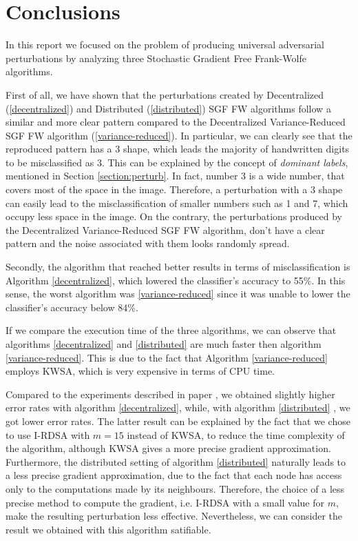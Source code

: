 \section{Conclusions}
In this report we focused on the problem of producing universal adversarial perturbations by analyzing three
Stochastic Gradient Free Frank-Wolfe algorithms.

First of all, we have shown that the perturbations created by Decentralized (\ref{decentralized}) and Distributed (\ref{distributed})
SGF FW algorithms follow a similar and more clear pattern compared to the Decentralized Variance-Reduced SGF FW
algorithm (\ref{variance-reduced}). In particular, we can clearly see that the reproduced pattern has a 3 shape, which
leads the majority of handwritten digits to be misclassified as 3. This can be explained by the concept of \textit{dominant labels},
mentioned in Section \ref{section:perturb}. In fact, number 3 is a wide number, that covers most of the space in the image. Therefore, a
perturbation with a 3 shape can easily lead to the misclassification of smaller numbers such as 1 and 7, which occupy
less space in the image. On the contrary, the perturbations produced by the Decentralized Variance-Reduced SGF FW algorithm,
don't have a clear pattern and the noise associated with them looks randomly spread.

Secondly, the algorithm that reached better results in terms of misclassification is Algorithm \ref{decentralized},
which lowered the classifier's accuracy to 55\%. In this sense, the worst algorithm was \ref{variance-reduced} since
it was unable to lower the classifier's accuracy below 84\%.

If we compare the execution time of the three algorithms, we can observe that algorithms \ref{decentralized} and \ref{distributed}
are much faster then algorithm \ref{variance-reduced}. This is due to the fact that Algorithm \ref{variance-reduced}
employs KWSA, which is very expensive in terms of CPU time.

Compared to the experiments described in paper \cite{A3}, we obtained slightly higher error rates with algorithm
\ref{decentralized}, while, with algorithm \ref{distributed} , we got lower error rates. The latter result can be
explained by the fact that we chose to use I-RDSA with $m=15$ instead of KWSA, to reduce the time complexity of the algorithm,
although KWSA gives a more precise gradient approximation. Furthermore, the distributed setting of algorithm \ref{distributed}
naturally leads to a less precise gradient approximation, due to the fact that each node has access only to the
computations made by its neighbours. Therefore, the choice of a less precise method to compute the gradient, i.e. I-RDSA with a
small value for $m$, make the resulting perturbation less effective. Nevertheless, we can consider the result we obtained
with this algorithm satifiable.



